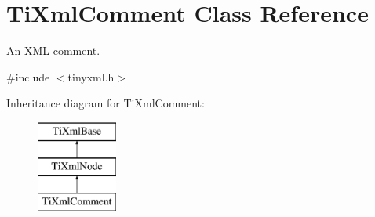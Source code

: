 \hypertarget{class_ti_xml_comment}{
\section{TiXmlComment Class Reference}
\label{class_ti_xml_comment}
}


An XML comment.  




{\ttfamily \#include $<$tinyxml.h$>$}

Inheritance diagram for TiXmlComment:\begin{figure}[H]
\begin{center}
\leavevmode
\includegraphics[height=3.000000cm]{class_ti_xml_comment}
\end{center}
\end{figure}
